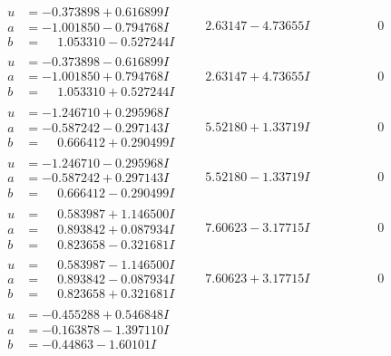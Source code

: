 \documentclass[1p]{elsarticle_modified}
\theoremstyle{definition}
\begin{document}
$$\begin{array}{c|c|c}
\begin{aligned}
u &= -0.373898 + 0.616899 I \\
a &= -1.001850 - 0.794768 I \\
b &= \phantom{-}1.053310 - 0.527244 I\end{aligned}
 & \phantom{-}2.63147 - 4.73655 I & \phantom{-0.000000 } 0 \\ \hline\begin{aligned}
u &= -0.373898 - 0.616899 I \\
a &= -1.001850 + 0.794768 I \\
b &= \phantom{-}1.053310 + 0.527244 I\end{aligned}
 & \phantom{-}2.63147 + 4.73655 I & \phantom{-0.000000 } 0 \\ \hline\begin{aligned}
u &= -1.246710 + 0.295968 I \\
a &= -0.587242 - 0.297143 I \\
b &= \phantom{-}0.666412 + 0.290499 I\end{aligned}
 & \phantom{-}5.52180 + 1.33719 I & \phantom{-0.000000 } 0 \\ \hline\begin{aligned}
u &= -1.246710 - 0.295968 I \\
a &= -0.587242 + 0.297143 I \\
b &= \phantom{-}0.666412 - 0.290499 I\end{aligned}
 & \phantom{-}5.52180 - 1.33719 I & \phantom{-0.000000 } 0 \\ \hline\begin{aligned}
u &= \phantom{-}0.583987 + 1.146500 I \\
a &= \phantom{-}0.893842 + 0.087934 I \\
b &= \phantom{-}0.823658 - 0.321681 I\end{aligned}
 & \phantom{-}7.60623 - 3.17715 I & \phantom{-0.000000 } 0 \\ \hline\begin{aligned}
u &= \phantom{-}0.583987 - 1.146500 I \\
a &= \phantom{-}0.893842 - 0.087934 I \\
b &= \phantom{-}0.823658 + 0.321681 I\end{aligned}
 & \phantom{-}7.60623 + 3.17715 I & \phantom{-0.000000 } 0 \\ \hline\begin{aligned}
u &= -0.455288 + 0.546848 I \\
a &= -0.163878 - 1.397110 I \\
b &= -0.44863 - 1.60101 I\end{aligned}

\end{array}$$
\end{document}

